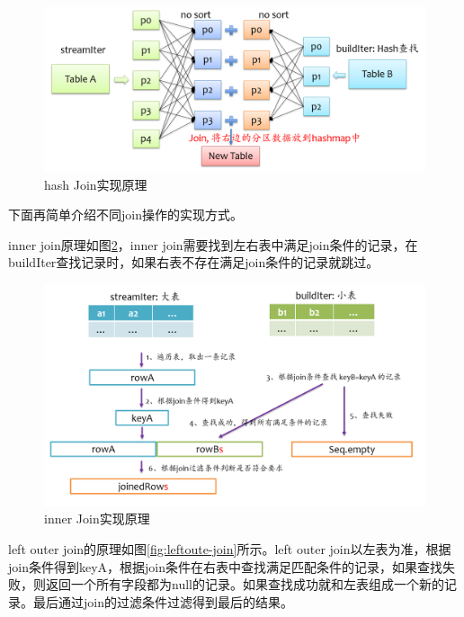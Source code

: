 \begin{figure}[htbp]
    \centering
    \includegraphics[width=1\textwidth]{Img/spark-sql-hash-join.png}
    \caption{hash Join实现原理}
    \label{fig:hash-join}
\end{figure}

下面再简单介绍不同join操作的实现方式。

inner join原理如图\ref{fig:inner-join}，inner join需要找到左右表中满足join条件的记录，在buildIter查找记录时，如果右表不存在满足join条件的记录就跳过。

\begin{figure}[htbp]
    \centering
    \includegraphics[width=1\textwidth]{Img/spark-sql-inner-join.png}
    \caption{inner Join实现原理}
    \label{fig:inner-join}
\end{figure}

left outer join的原理如图\ref{fig:leftoute-join}所示。left outer join以左表为准，根据join条件得到keyA，根据join条件在右表中查找满足匹配条件的记录，如果查找失败，则返回一个所有字段都为null的记录。如果查找成功就和左表组成一个新的记录。最后通过join的过滤条件过滤得到最后的结果。

